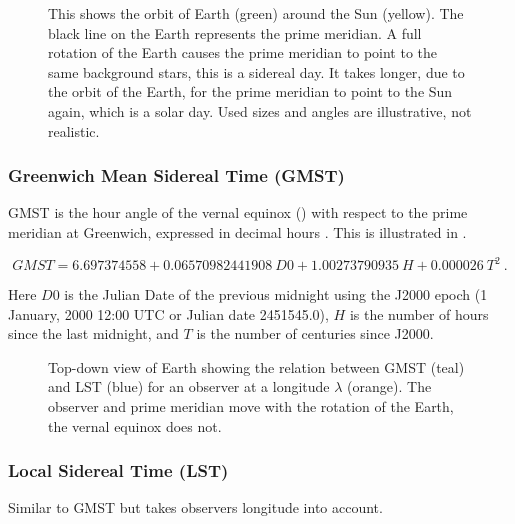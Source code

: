 \begin{figure}
    \centering
    
    \caption{This shows the orbit of Earth (green) around the Sun
             (yellow). The black line on the Earth represents the prime
             meridian. A full rotation of the Earth causes the prime
             meridian to point to the same background stars, this is a
             sidereal day. It takes longer, due to the orbit of the
             Earth, for the prime meridian to point to the Sun again,
             which is a solar day. Used sizes and angles are
             illustrative, not realistic.}
    \label{fig:sidereal_time}
\end{figure}


\subsubsection{Greenwich Mean Sidereal Time (GMST)}

GMST is the hour angle of the vernal equinox ()
with respect to the prime meridian at Greenwich, expressed in decimal
hours \cite{kaplan:2011aa}. This is illustrated in
.

\begin{equation}
    \mathit{GMST} = 6.697374558 + 0.06570982441908\ \mathit{D0} +
                    1.00273790935\ H + 0.000026\ T^2 \ .
\end{equation}

Here $D0$ is the Julian Date of the previous midnight using the J2000
epoch (1 January, 2000 12:00 UTC or Julian date 2451545.0), $H$ is the
number of hours since the last midnight, and $T$ is the number of
centuries since J2000.

\begin{figure}
    \centering
    
    \caption{Top-down view of Earth showing the relation between GMST
             (teal) and LST (blue) for an observer at a longitude
             $\lambda$ (orange). The observer and prime meridian move with
             the rotation of the Earth, the vernal equinox does not.}
    \label{fig:wgs84_gmst_lst}
\end{figure}


\subsubsection{Local Sidereal Time (LST)}

Similar to GMST but takes observers longitude into account.

